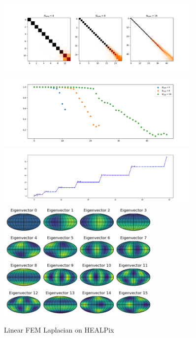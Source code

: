 \begin{figure}[h]
	\label{fig:FEMHealpix}
	\caption{Linear FEM Laplacian on HEALPix}
	\centering
	\includegraphics[width=0.9\textwidth]{../codes/03.FEM_laplacian/HEALPix/img/linearFEM.png}
	\includegraphics[width=0.9\textwidth]{../codes/03.FEM_laplacian/HEALPix/img/linearFEM_diagonal.png}	
	\includegraphics[width=0.9\textwidth]{../codes/03.FEM_laplacian/HEALPix/img/FEM_eigenvalues_16.png}	
	\includegraphics[width=0.7\textwidth]{../codes/03.FEM_laplacian/HEALPix/img/linear_FEM_8_eigenvectors.png}	
\end{figure}

